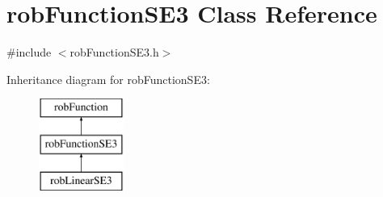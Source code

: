 \hypertarget{classrob_function_s_e3}{}\section{rob\+Function\+S\+E3 Class Reference}
\label{classrob_function_s_e3}


{\ttfamily \#include $<$rob\+Function\+S\+E3.\+h$>$}

Inheritance diagram for rob\+Function\+S\+E3\+:\begin{figure}[H]
\begin{center}
\leavevmode
\includegraphics[height=3.000000cm]{d1/d3d/classrob_function_s_e3}
\end{center}
\end{figure}
